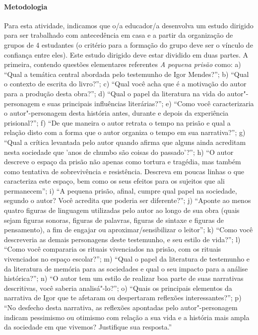 \documentclass[11pt]{extarticle}
\begin{document}
\paragraph{Metodologia} Para esta atividade, indicamos que o/a educador/a
desenvolva um estudo dirigido para ser trabalhado com antecedência em
casa e a partir da organização de grupos de 4 estudantes (o critério
para a formação do grupo deve ser o vínculo de confiança entre eles).
Este estudo dirigido deve estar dividido em duas partes. A primeira, 
contendo questões elementares referentes \emph{A pequena prisão}
como: a) ``Qual a temática central abordada pelo testemunho de Igor
Mendes?''; b) ``Qual o contexto de escrita do livro?''; c) ``Qual você acha que
é a motivação do autor para a produção desta obra?''; d) ``Qual o papel da
literatura na vida do autor"-personagem e suas principais influências
literárias?''; e) ``Como você caracterizaria o autor"-personagem desta
história antes, durante e depois da experiência prisional?''; f) ``De que
maneira o autor retrata o tempo na prisão e qual a relação disto com a
forma que o autor organiza o tempo em sua narrativa?''; g) ``Qual a crítica
levantada pelo autor quando afirma que alguns ainda acreditam nesta
sociedade que 'anos de chumbo são coisas do passado'?''; h) ``O autor
descreve o espaço da prisão não apenas como tortura e tragédia, mas
também como tentativa de sobrevivência e resistência. Descreva em poucas
linhas o que caracteriza este espaço, bem como os seus efeitos para os
sujeitos que ali permanecem''; i) ``A pequena prisão, afinal, cumpre qual
papel na sociedade, segundo o autor? Você acredita que poderia ser
diferente?''; j) ``Aponte ao menos quatro figuras de linguagem utilizadas
pelo autor ao longo de sua obra (quais sejam figuras sonoras, figuras de
palavras, figuras de sintaxe e figuras de pensamento), a fim de engajar
ou aproximar/sensibilizar o leitor''; k) ``Como você descreveria as demais
personagens deste testemunho, e seu estilo de vida?''; l) ``Como você
compararia os rituais vivenciados na prisão, com os rituais vivenciados
no espaço escolar?''; m) ``Qual o papel da literatura de testemunho e da
literatura de memória para as sociedades e qual o seu impacto para a
análise histórica?''; n) ``O autor tem um estilo de realizar boa parte de
suas narrativas descritivas, você saberia analisá"-lo?''; o) ``Quais os
principais elementos da narrativa de Igor que te afetaram ou despertaram
reflexões interessantes?''; p) ``No desfecho desta narrativa, as reflexões
apontadas pelo autor"-personagem indicam pessimismo ou otimismo com
relação a sua vida e a história mais ampla da sociedade em que vivemos?
Justifique sua resposta.'' 
\end{document}
